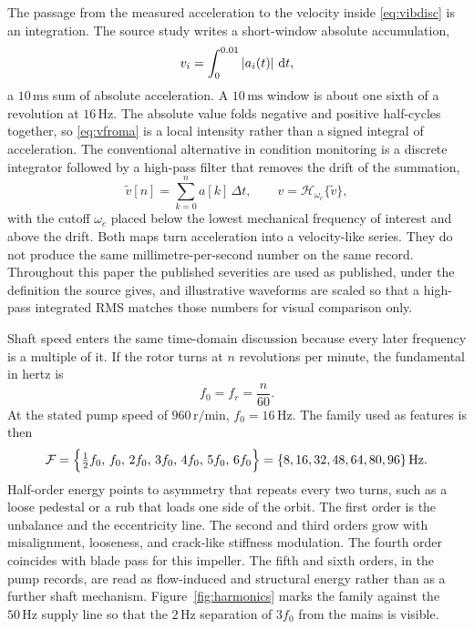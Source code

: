 The passage from the measured acceleration to the velocity inside \eqref{eq:vibdisc} is an integration.
The source study writes a short-window absolute accumulation,
\begin{equation}
v_{i}=\int_{0}^{0.01}\left\lvert a_{i}(t) \right\rvert\,\mathrm{d}t,
\label{eq:vfroma}
\end{equation}
a \(10\,\mathrm{ms}\) sum of absolute acceleration.
A \(10\,\mathrm{ms}\) window is about one sixth of a revolution at \(16\,\mathrm{Hz}\).
The absolute value folds negative and positive half-cycles together, so \eqref{eq:vfroma} is a local intensity rather than a signed integral of acceleration.
The conventional alternative in condition monitoring is a discrete integrator followed by a high-pass filter that removes the drift of the summation,
\begin{equation}
\tilde{v}[n]=\sum_{k=0}^{n} a[k]\,\Delta t,\qquad
v=\mathcal{H}_{\omega_{c}}\{\tilde{v}\},
\label{eq:integrate}
\end{equation}
with the cutoff \(\omega_{c}\) placed below the lowest mechanical frequency of interest and above the drift.
Both maps turn acceleration into a velocity-like series.
They do not produce the same millimetre-per-second number on the same record.
Throughout this paper the published severities are used as published, under the definition the source gives, and illustrative waveforms are scaled so that a high-pass integrated RMS matches those numbers for visual comparison only.

Shaft speed enters the same time-domain discussion because every later frequency is a multiple of it.
If the rotor turns at \(n\) revolutions per minute, the fundamental in hertz is
\begin{equation}
f_{0}=f_{r}=\frac{n}{60}.
\label{eq:f0}
\end{equation}
At the stated pump speed of \(960\,\mathrm{r/min}\), \(f_{0}=16\,\mathrm{Hz}\).
The family used as features is then
\begin{equation}
\mathcal{F}=\Bigl\{\tfrac12 f_{0},\, f_{0},\, 2f_{0},\, 3f_{0},\, 4f_{0},\, 5f_{0},\, 6f_{0}\Bigr\}
=\{8,16,32,48,64,80,96\}\,\mathrm{Hz}.
\label{eq:family}
\end{equation}
Half-order energy points to asymmetry that repeats every two turns, such as a loose pedestal or a rub that loads one side of the orbit.
The first order is the unbalance and the eccentricity line.
The second and third orders grow with misalignment, looseness, and crack-like stiffness modulation.
The fourth order coincides with blade pass for this impeller.
The fifth and sixth orders, in the pump records, are read as flow-induced and structural energy rather than as a further shaft mechanism.
Figure~\ref{fig:harmonics} marks the family against the \(50\,\mathrm{Hz}\) supply line so that the \(2\,\mathrm{Hz}\) separation of \(3f_{0}\) from the mains is visible.

